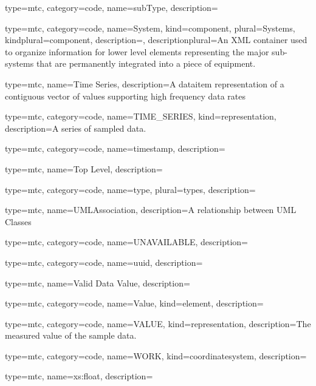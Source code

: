 {
  type=mtc,
  category=code,
  name={subType},
  description={}
}


{
  type=mtc,
  category=code,
  name={System},
  kind={component},
  plural={Systems},
  kindplural={component},
  description={},
  descriptionplural={An XML container used to organize information for \gls{lower level} elements representing the major sub-systems that are permanently integrated into a piece of equipment.}
}


{
  type=mtc,
  name={Time Series},
  description={A \gls{dataitem} representation of a contiguous vector of values supporting high frequency data rates}
}


{
  type=mtc,
  category=code,
  name={TIME\_SERIES},
  kind={representation},
  description={A series of sampled data. }
}


{
  type=mtc,
  category=code,
  name={timestamp},
  description={}
}


{
  type=mtc,
  name={Top Level},
  description={}
}


{
  type=mtc,
  category=code,
  name={type},
  plural={types},
  description={}
}


{
  type=mtc,
  name=UMLAssociation,
  description={A relationship between UML Classes}
}


{
  type=mtc,
  category=code,
  name={UNAVAILABLE},
  description={}
}


{
  type=mtc,
  category=code,
  name={uuid},
  description={}
}


{
  type=mtc,
  name={Valid Data Value},
  description={}
}


{
  type=mtc,
  category=code,
  name={Value},
  kind={element},
  description={}
}


{
  type=mtc,
  category=code,
  name={VALUE},
  kind={representation},
  description={The measured value of the sample data.}
}


{
  type=mtc,
  category=code,
  name={WORK},
  kind={coordinatesystem},
  description={}
}


{
  type=mtc,
  name={xs:float},
  description={}
}


